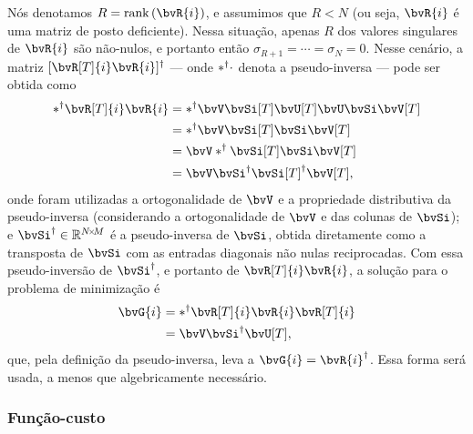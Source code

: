 Nós denotamos $R = \rank{\bvR{i}}$, e assumimos que $R < N$ (ou seja, $\bvR{i}$ é uma matriz de posto deficiente). Nessa situação, apenas $R$ dos valores singulares de $\bvR{i}$ são não-nulos, e portanto então $\sigma_{R+1} = \cdots = \sigma_{N} = 0$. Nesse cenário, a matriz $\pinv{[\bvR[T]{i} \bvR{i}]}$ --- onde $\pinv*{\cdot}$ denota a pseudo-inversa --- pode ser obtida como
\begin{equation}
	\begin{split}
		\pinv*{\bvR[T]{i} \bvR{i}}
		& = \pinv*{\bvV \bvSi[T] \bvU[T] \bvU \bvSi \bvV[T]} \\
		& = \pinv*{\bvV \bvSi[T] \bvSi \bvV[T]} \\
		& = \bvV \pinv*{\bvSi[T] \bvSi} \bvV[T] \\
		& = \bvV \pinv{\bvSi} \pinv{{\bvSi[T]}} \bvV[T],
	\end{split}
\end{equation}
onde foram utilizadas a ortogonalidade de $\bvV$ e a propriedade distributiva da pseudo-inversa (considerando a ortogonalidade de $\bvV$ e das colunas de $\bvSi$); e $\pinv{\bvSi} \in\re^{\sz{N}{M}}$ é a pseudo-inversa de $\bvSi$, obtida diretamente como a transposta de $\bvSi$ com as entradas diagonais não nulas reciprocadas. Com essa pseudo-inversão de $\pinv{\bvSi}$, e portanto de $\bvR[T]{i} \bvR{i}$, a solução para o problema de minimização é
\begin{equation}
	\begin{split}
		\bvG{i}
		& = \pinv*{\bvR[T]{i} \bvR{i}} \bvR[T]{i} \\
		& = \bvV \pinv{\bvSi} \bvU[T],
	\end{split}
	\label{eq:sec2:solution-G_pseudo-inverse}
\end{equation}
que, pela definição da pseudo-inversa, leva a $\bvG{i} = \pinv{\bvR{i}}$. Essa forma será usada, a menos que algebricamente necessário.

\subsubsection*{Função-custo}

